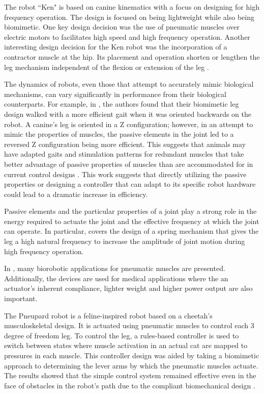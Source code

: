 The robot ``Ken" is based on canine kinematics with a focus on designing for
high frequency operation. The design is focused on being lightweight while also
being biomimetic. One key design decision was the use of pneumatic muscles over
electric motors to facilitates high speed and high frequency operation.
Another interesting design
decision for the Ken robot was the incorporation of a contractor muscle at the
hip. Its placement and operation shorten or lengthen the leg mechanism
independent of the flexion or extension of the leg \cite{Narioka2012}.


The dynamics of robots, even those that attempt to accurately mimic biological mechanisms, can vary significantly in performance from their biological counterparts. For example, in \cite{HindLegMorphology}, the authors found that their biomimetic leg design walked with a more efficient gait when it was oriented backwards on the robot. A canine's leg is oriented in a Z configuration; however, in an attempt to mimic the properties of muscles, the passive elements in the joint led to a reversed Z configuration being more efficient. This suggests that animals may have adapted gaits and stimulation patterns for redundant muscles that take better advantage of passive properties of muscles than are accommodated for in current control designs \cite{HindLegMorphology}. This work suggests that directly utilizing the passive properties or designing a controller that can adapt to its specific robot hardware could lead to a dramatic increase in efficiency.

Passive elements and the particular properties of a joint play a strong role in
the energy required to actuate the joint and the effective frequency at which the joint
can operate. In particular, \cite{Na2015} covers the design of a spring
mechanism that gives the leg a high natural frequency to increase the amplitude of joint
motion during high frequency operation.


In \cite{PAMApplicationSurvey}, many biorobotic applications for pneumatic
muscles are presented.
Additionally, the devices are used for medical applications where the an actuator's
inherent compliance, lighter weight and higher power output are also important. 

The Pneupard robot is a feline-inspired robot based on a cheetah's
musculoskeletal design. It is actuated using pneumatic muscles to control each 3
degree of freedom leg. To control the leg, a rules-based controller is used to switch between
states where muscle activation in an actual cat are mapped to pressures in each
muscle. This controller design was aided by taking a biomimetic approach to determining the lever
arms by which the pneumatic muscles actuate. The results showed that the simple
control system remained effective even in the face of obstacles in the robot's
path due to the compliant biomechanical design \cite{Pneupard2013}.

